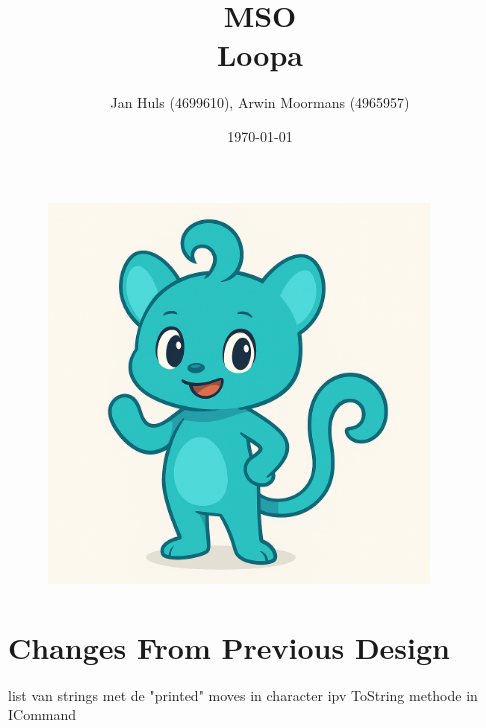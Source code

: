 \documentclass[11pt,a4paper]{article}
\date{\monthyear\today}
\title{\textbf{MSO \\ Loopa}}
\author{Jan Huls (4699610), Arwin Moormans (4965957)}
\begin{document}
 
    \maketitle
    \begin{figure}[htbp]
        \centering
        \includegraphics[width=0.9\textwidth]{mascot}
        \label{image-mascot}
    \end{figure}
    \newpage
    \section{Changes From Previous Design}\label{sec:changes-from-previous-design}
    list van strings met de "printed" moves in character ipv ToString methode in ICommand
\end{document}
